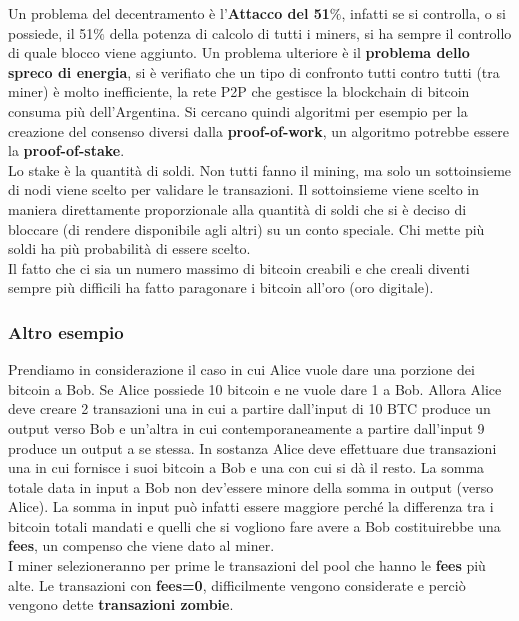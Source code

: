 Un problema del decentramento è l'\textbf{Attacco del 51$\%$}, infatti se si controlla, o si possiede, il 51$\%$ della potenza di calcolo di tutti i miners, si ha sempre il controllo di quale blocco viene aggiunto. Un problema ulteriore è il \textbf{problema dello spreco di energia}, si è verifiato che un tipo di confronto tutti contro tutti (tra miner) è molto inefficiente, la rete P2P che gestisce la blockchain di bitcoin consuma più dell’Argentina. Si cercano quindi algoritmi per esempio per la creazione del consenso diversi dalla \textbf{proof-of-work}, un algoritmo potrebbe essere la \textbf{proof-of-stake}.\\

Lo stake è la quantità di soldi. Non tutti fanno il mining, ma solo un sottoinsieme di nodi viene scelto per validare le transazioni. Il sottoinsieme viene scelto in maniera direttamente proporzionale alla quantità di soldi che si è deciso di bloccare (di rendere disponibile agli altri) su un conto speciale. Chi mette più soldi ha più probabilità di essere scelto. \\

Il fatto che ci sia un numero massimo di bitcoin creabili e che creali diventi sempre più difficili ha fatto paragonare i bitcoin all’oro (oro digitale).

\subsubsection{Altro esempio}
Prendiamo in considerazione il caso in cui Alice vuole dare una porzione dei bitcoin a Bob.
Se Alice possiede 10 bitcoin e ne vuole dare 1 a Bob. Allora Alice deve creare 2 transazioni una in cui a partire dall’input di 10 BTC  produce un output verso Bob e un’altra in cui contemporaneamente a partire dall’input 9 produce un output a se stessa. In sostanza Alice deve effettuare due transazioni una in cui fornisce i suoi bitcoin a Bob e una con cui si dà il resto. La somma totale data in input a Bob non dev’essere minore della somma in output (verso Alice). La somma in input può infatti essere maggiore perché la differenza tra i bitcoin totali mandati e quelli che si vogliono fare avere a Bob costituirebbe una \textbf{fees}, un compenso che viene dato al miner. \\ I miner selezioneranno per prime le transazioni del pool che hanno le \textbf{fees} più alte. Le transazioni con \textbf{fees=0}, difficilmente vengono considerate e perciò vengono dette \textbf{transazioni zombie}. \\

